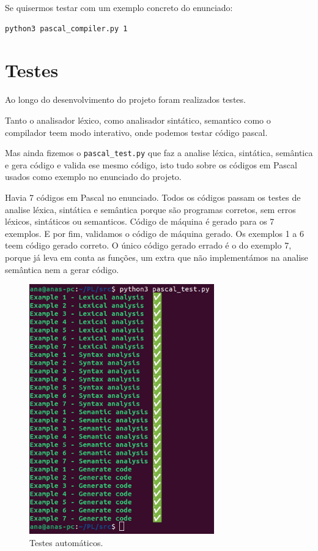 \documentclass[12pt,a4paper]{report}
\begin{document}
Se quisermos testar com um exemplo concreto do enunciado:
\begin{verbatim}
python3 pascal_compiler.py 1
\end{verbatim}
\chapter{Testes}

Ao longo do desenvolvimento do projeto foram realizados testes.

Tanto o analisador léxico, como analisador sintático, semantico como o compilador teem modo interativo, onde podemos testar código pascal.

Mas ainda fizemos o \texttt{pascal\_test.py} que faz a analise léxica, sintática, semântica e gera código e valida ese mesmo código, isto tudo sobre os códigos em Pascal usados como exemplo no
enunciado do projeto.

Havia 7 códigos em Pascal no enunciado. Todos os códigos passam os testes de analise léxica, sintática e semântica porque são programas corretos, sem erros léxicos, sintáticos ou semanticos.
Código de máquina é gerado para os 7 exemplos. E por fim, validamos o código de máquina gerado. Os exemplos 1 a 6 teem código gerado correto. O único código gerado errado é o do exemplo 7, porque já leva
em conta as funções, um extra que não implementámos na analise semântica nem a gerar código.

\begin{figure}[H]
    \centering
    \includegraphics[width=8cm]{images/tests.png}
    \caption{Testes automáticos.}    
\end{figure}
\end{document}
